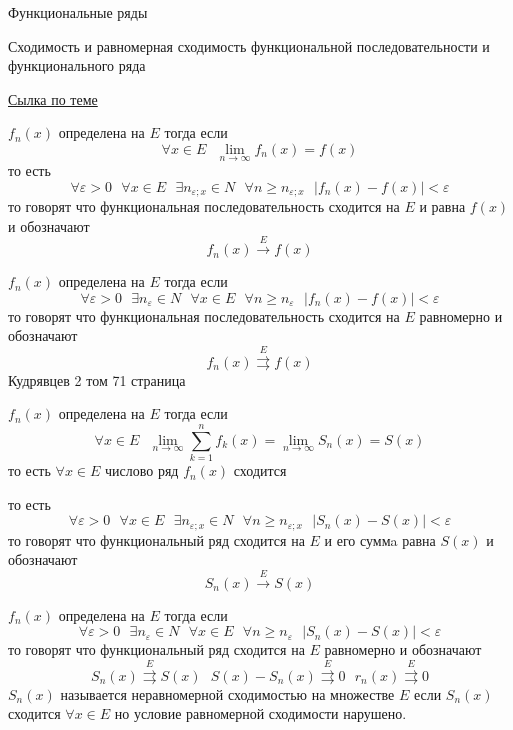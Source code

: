 \begin{title}
  Функциональные ряды
\end{title}

\begin{title}[\Large]
  Сходимость и равномерная сходимость функциональной последовательности и
  функционального ряда
\end{title}

\href{http://nuclphys.sinp.msu.ru/mathan/p3/m3102.html}{Сылка по теме}

\begin{define}
  $f_n(x)$ определена на $E$ тогда если
  $$
  \forall x \in E ~~~ \lim_{n \to \infty} f_n(x) = f(x)
  $$
  то есть
  $$
  \forall \varepsilon > 0 ~~~ \forall x \in E ~~~ \exists n_{\varepsilon; x}
  \in N ~~~ \forall n \ge n_{\varepsilon; x} ~~~ \left| f_n(x) - f(x) \right|
  < \varepsilon
  $$
  то говорят что функциональная последовательность сходится на $E$ и равна
  $f(x)$ и обозначают
  $$
  f_n(x) \stackrel{E}{\to} f(x)
  $$
\end{define}

\begin{define}
  $f_n(x)$ определена на $E$ тогда если
  $$
  \forall \varepsilon > 0 ~~~ \exists n_{\varepsilon} \in N ~~~ \forall x \in E
  ~~~ \forall n \ge n_{\varepsilon} ~~~ |f_n (x) - f(x)| < \varepsilon
  $$
  то говорят что функциональная последовательность сходится на $E$ равномерно и
  обозначают
  $$
  f_n(x) \stackrel{E}{\rightrightarrows} f(x)
  $$
  Кудрявцев 2 том 71 страница
\end{define}

\begin{define}
  $f_n(x)$ определена на $E$ тогда если
  $$
  \forall x \in E ~~~ \lim_{n \to \infty} \sum_{k=1}^n f_k(x) =
  \lim_{n \to \infty} S_n(x) = S(x)
  $$
  то есть $\forall x \in E$ числово ряд $f_n(x)$
  сходится

  то есть
  $$
  \forall \varepsilon > 0 ~~~ \forall x \in E ~~~ \exists n_{\varepsilon; x}
  \in N ~~~ \forall n \ge n_{\varepsilon; x} ~~~ \left| S_n(x) - S(x) \right|
  < \varepsilon
  $$
  то говорят что функциональный ряд сходится на $E$ и его суммa равна $S(x)$ и
  обозначают
  $$
  S_n(x) \stackrel{E}{\to} S(x)
  $$
\end{define}

\begin{define}
  $f_n(x)$ определена на $E$ тогда если
  $$
  \forall \varepsilon > 0 ~~~ \exists n_{\varepsilon} \in N ~~~ \forall x \in E
  ~~~ \forall n \ge n_{\varepsilon} ~~~ |S_n (x) - S(x)| < \varepsilon
  $$
  то говорят что функциональный ряд сходится на $E$ равномерно и обозначают
  $$
  S_n(x) \stackrel{E}{\rightrightarrows} S(x) ~~~
  S(x) - S_n(x) \stackrel{E}{\rightrightarrows} 0 ~~~
  r_n(x) \stackrel{E}{\rightrightarrows} 0
  $$
  $S_n(x)$ называется неравномерной сходимостью на множестве $E$ если $S_n(x)$
  сходится $\forall x \in E$ но условие равномерной сходимости нарушено.
\end{define}

